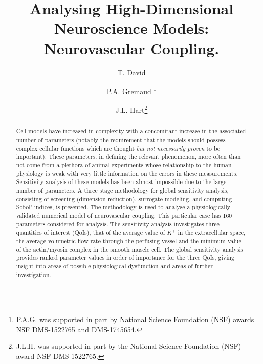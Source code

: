 \documentclass[smallextended]{svjour3}
\numberwithin{equation}{section}
\begin{document}
\title{Analysing High-Dimensional Neuroscience Models: Neurovascular Coupling. }
\author{ T. David \and P.A. Gremaud  \thanks{P.A.G. was supported in part by National Science Foundation (NSF) awards NSF DMS-1522765 and DMS-1745654.}\and J.L. Hart\thanks{J.L.H. was supported in part by the National Science Foundation (NSF) award NSF DMS-1522765.}}
\maketitle
\thispagestyle{empty}

\begin{abstract}
Cell models have increased in complexity with a concomitant increase in the associated number of parameters (notably the requirement that the models should possess complex cellular functions which are thought \textit{but not necessarily proven} to be important). These parameters, in defining the relevant phenomenon, more often than not come from a plethora of animal experiments whose relationship to the human physiology is weak with very little information on the errors in these measurements.  Sensitivity analysis of these models has been almost impossible due to the large number of parameters. A three stage methodology for global sensitivity analysis, consisting of screening (dimension reduction), surrogate modeling, and computing Sobol' indices, is presented. The methodology is used to analyse a physiologically validated numerical model of neurovascular coupling. This particular case has 160 parameters considered for analysis. The sensitivity analysis investigates three quantities of interest (QoIs), that of the  average value of $K^+$ in the extracellular space, the average volumetric flow rate through the perfusing vessel and the minimum value of the actin/myosin complex in the smooth muscle cell. The global sensitivity analysis provides ranked parameter values in order of importance for the three QoIs, giving insight into areas of possible physiological dysfunction and areas of further investigation. 
\end{abstract}




  











\end{document}
